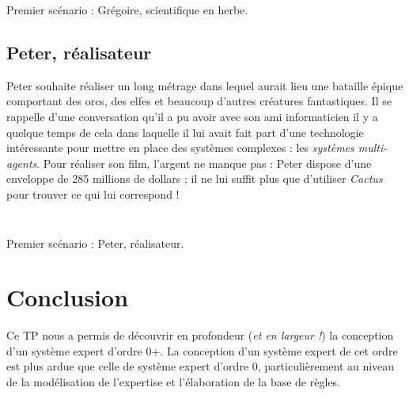 \documentclass[a4paper,12pt]{article}
\begin{document}
\begin{listing}[H]
	\centering
	\inputminted[breaklines=true,linenos,lastline=42]{text}{../scenarioGreg.txt}
\end{listing}
	
\begin{listing}[H]
	\centering
	\inputminted[breaklines=true,linenos,firstline=43]{text}{../scenarioGreg.txt}
	\caption{Premier scénario : Grégoire, scientifique en herbe.}
\end{listing}


	\subsection{Peter, réalisateur}
	
	Peter souhaite réaliser un long métrage dans lequel aurait lieu une bataille épique comportant des orcs, des elfes et beaucoup d'autres créatures fantastiques. Il se rappelle d'une conversation qu'il a pu avoir avec son ami informaticien il y a quelque temps de cela dans laquelle il lui avait fait part d'une technologie intéressante pour mettre en place des systèmes complexes : les \textit{systèmes multi-agents}. Pour réaliser son film, l'argent ne manque pas : Peter dispose d'une enveloppe de 285 millions de dollars ; il ne lui suffit plus que d'utiliser \textit{Cactus} pour trouver ce qui lui correspond !


\begin{listing}[H]
	\centering
	\inputminted[breaklines=true,linenos,lastline=12]{text}{../scenarioPeter.txt}
\end{listing}
	
\begin{listing}[H]
	\centering
	\inputminted[breaklines=true,linenos,firstline=13]{text}{../scenarioPeter.txt}
	\caption{Premier scénario : Peter, réalisateur.}
\end{listing}

\newpage
\section{Conclusion}

	Ce TP nous a permis de découvrir en profondeur (\textit{et en largeur !}) la conception d'un système expert d'ordre 0+. La conception d'un système expert de cet ordre est plus ardue que celle de système expert d'ordre 0, particulièrement au niveau de la modélisation de l'expertise et l'élaboration de la base de règles.
\end{document}
